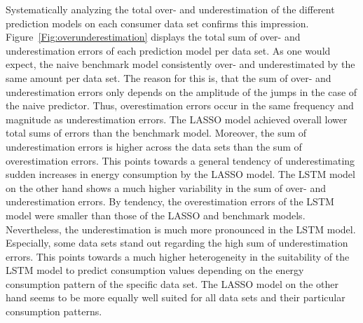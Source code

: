 Systematically analyzing the total over- and underestimation of the different prediction models on each consumer data set confirms this impression. Figure~\ref{Fig:overunderestimation} displays the total sum of over- and underestimation errors of each prediction model per data set. As one would expect, the naive benchmark model consistently over- and underestimated by the same amount per data set. The reason for this is, that the sum of over- and underestimation errors only depends on the amplitude of the jumps in the case of the naive predictor. Thus, overestimation errors occur in the same frequency and magnitude as underestimation errors. The LASSO model achieved overall lower total sums of errors than the benchmark model. Moreover, the sum of underestimation errors is higher across the data sets than the sum of overestimation errors. This points towards a general tendency of underestimating sudden increases in energy consumption by the LASSO model. The LSTM model on the other hand shows a much higher variability in the sum of over- and underestimation errors. By tendency, the overestimation errors of the LSTM model were smaller than those of the LASSO and benchmark models. Nevertheless, the underestimation is much more pronounced in the LSTM model. Especially, some data sets stand out regarding the high sum of underestimation errors. This points towards a much higher heterogeneity in the suitability of the LSTM model to predict consumption values depending on the energy consumption pattern of the specific data set. The LASSO model on the other hand seems to be more equally well suited for all data sets and their particular consumption patterns.
%
